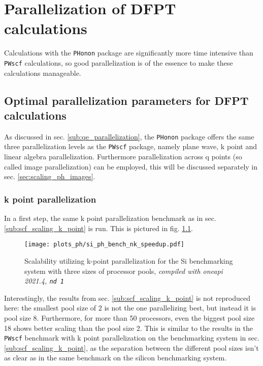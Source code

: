 \documentclass[main.tex]{subfiles}
\begin{document}
\chapter{Parallelization of DFPT calculations}\label{ch:optimization_ph}

Calculations with the \texttt{PHonon} package are significantly more time intensive than \texttt{PWscf} calculations, so good parallelization is of the essence to make these calculations manageable.

\section{Optimal parallelization parameters for DFPT calculations}

As discussed in sec. \ref{sub:qe_parallelization}, the \texttt{PHonon} package offers the same three parallelization levels as the \texttt{PWscf} package, namely plane wave, k point and linear algebra parallelization.
Furthermore parallelization across q points (so called image parallelization) can be employed, this will be discussed separately in sec. \ref{sec:scaling_ph_images}.

\subsection{k point parallelization}

In a first step, the same k point parallelization benchmark as in sec. \ref{sub:scf_scaling_k_point} is run. This is pictured in fig. \ref{fig:scaling_ph_nk_si}.

\begin{figure}[htb!]
    \centering
    \texttt{[image: plots\_ph/si\_ph\_bench\_nk\_speedup.pdf]}
    \caption{Scalability utilizing k-point parallelization for the Si benchmarking system with three sizes of processor pools, \emph{\QE compiled with \gls{oneapi} 2021.4, \texttt{nd 1}}}
    \label{fig:scaling_ph_nk_si}
\end{figure}
Interestingly, the results from sec. \ref{sub:scf_scaling_k_point} is not reproduced here: the smallest pool size of 2 is not the one parallelizing best, but instead it is pool size 8.
Furthermore, for more than 50 processors, even the biggest pool size 18 shows better scaling than the pool size 2.
This is similar to the results in the \texttt{PWscf} benchmark with k point parallelization on the \TaS benchmarking system in sec. \ref{sub:scf_scaling_k_point}, as the separation between the different pool sizes isn't as clear as in the same benchmark on the silicon benchmarking system.
\end{document}
